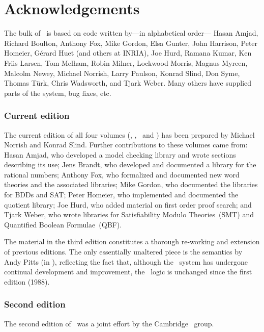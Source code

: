 \chapter*{Acknowledgements}

The bulk of \HOL\ is based on code written by---in alphabetical
order---%
Hasan Amjad,
Richard Boulton,
Anthony Fox,
Mike Gordon,
Elsa Gunter,
John Harrison,
Peter Homeier,
G\'erard Huet (and others at INRIA),
Joe Hurd,
Ramana Kumar,
Ken Friis Larsen,
Tom Melham,
Robin Milner,
Lockwood Morris,
Magnus Myreen,
Malcolm Newey,
Michael Norrish,
Larry Paulson,
Konrad Slind,
Don Syme,
Thomas T\"urk,
Chris Wadsworth,
and
Tjark Weber.
Many others have supplied parts of the system, bug fixes, etc.

\subsection*{Current edition}

The current edition of all four volumes (\LOGIC, \TUTORIAL,
\DESCRIPTION\ and \REFERENCE) has been prepared by Michael Norrish and
Konrad Slind. Further contributions to these volumes came from: Hasan
Amjad, who developed a model checking library and wrote sections
describing its use; Jens Brandt, who developed and documented a
library for the rational numbers; Anthony Fox, who formalized and
documented new word theories and the associated libraries; Mike
Gordon, who documented the libraries for BDDs and SAT; Peter Homeier,
who implemented and documented the quotient library; Joe Hurd, who
added material on first order proof search; and Tjark Weber, who wrote
libraries for Satisfiability Modulo Theories~(SMT) and Quantified
Boolean Formulae~(QBF).

\medskip

The material in the third edition constitutes a thorough re-working
and extension of previous editions.  The only essentially unaltered
piece is the semantics by Andy Pitts (in \LOGIC), reflecting the fact
that, although the \HOL\ system has undergone continual development
and improvement, the \HOL\ logic is unchanged since the first edition
(1988).

\newpage

\subsection*{Second edition}

The second edition of \REFERENCE\ was a joint effort by the Cambridge
\HOL\ group.

